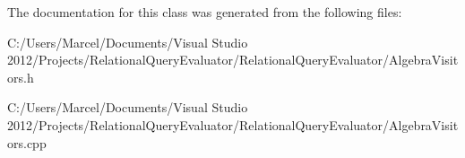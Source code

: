 The documentation for this class was generated from the following files\+:\begin{DoxyCompactItemize}
\item 
C\+:/\+Users/\+Marcel/\+Documents/\+Visual Studio 2012/\+Projects/\+Relational\+Query\+Evaluator/\+Relational\+Query\+Evaluator/Algebra\+Visitors.\+h\item 
C\+:/\+Users/\+Marcel/\+Documents/\+Visual Studio 2012/\+Projects/\+Relational\+Query\+Evaluator/\+Relational\+Query\+Evaluator/Algebra\+Visitors.\+cpp\end{DoxyCompactItemize}
